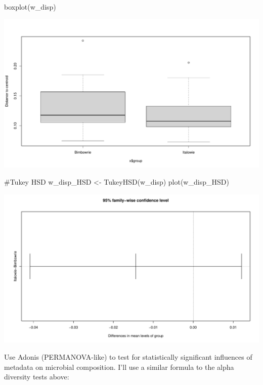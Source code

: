 \documentclass[
  letterpaper,
  DIV=11,
  numbers=noendperiod]{scrartcl}
\newenvironment{Shaded}{\begin{snugshade}}{\end{snugshade}}
\newcommand{\CommentTok}[1]{\textcolor[rgb]{0.37,0.37,0.37}{#1}}
\newcommand{\FunctionTok}[1]{\textcolor[rgb]{0.28,0.35,0.67}{#1}}
\newcommand{\NormalTok}[1]{\textcolor[rgb]{0.00,0.23,0.31}{#1}}
\newcommand{\OtherTok}[1]{\textcolor[rgb]{0.00,0.23,0.31}{#1}}
\begin{document}
\begin{Shaded}
\begin{Highlighting}[]
\FunctionTok{boxplot}\NormalTok{(w\_disp)}
\end{Highlighting}
\end{Shaded}

\includegraphics{code_files/figure-pdf/unnamed-chunk-5-6.pdf}

\begin{Shaded}
\begin{Highlighting}[]
\CommentTok{\#Tukey HSD}
\NormalTok{w\_disp\_HSD }\OtherTok{\textless{}{-}} \FunctionTok{TukeyHSD}\NormalTok{(w\_disp)}
\FunctionTok{plot}\NormalTok{(w\_disp\_HSD)}
\end{Highlighting}
\end{Shaded}

\includegraphics{code_files/figure-pdf/unnamed-chunk-5-7.pdf}

Use Adonis (PERMANOVA-like) to test for statistically significant
influences of metadata on microbial composition. I'll use a similar
formula to the alpha diversity tests above:
\end{document}
